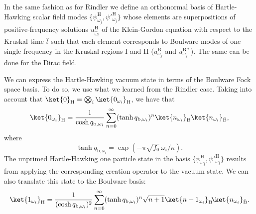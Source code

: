 In the same fashion as for Rindler we define an orthonormal basis 
of Hartle-Hawking scalar field modes $\{\psi^\text{H}_{\omega_j},\psi'^{\text{H}}_{\omega_j}\}$ whose elements are superpositions of  positive-frequency solutions
$u_{\hat\omega_i}^\text{H}$ of the Klein-Gordon equation with
respect to the Kruskal time $\hat t$
 such that each element  corresponds to Boulware modes of one single frequency in the Kruskal regions I and II
($u^\text{B}_{\omega_j}$ and $u^{\bar{\text{B}}*}_{\omega_j}$). The same can be
done for the Dirac field.

We can express the Hartle-Hawking vacuum state in terms of the
Boulware Fock space basis.  To do so, we use what we learned from the
Rindler case. Taking into account that $\ket{0}_\text{H}=\bigotimes_{
i}\ket{0_{\omega_i}}_\text{H}$, we have that
\begin{equation}\label{scavacinf}
\ket{0_{\omega_i}}_\text{H}=\frac{1}{\cosh q_{\text{b},\omega_i}}
\sum_{n=0}^\infty (\tanh q_{\text{b},\omega_i})^n  \ket{n_{\omega_i}}_\text{B}
\ket{n_{\omega_i}}_{{\bar{\text{B}}}},
\end{equation}
where
\begin{equation}\label{defr3}
\tanh q_{\text{b},\omega_i}=\exp\left({-\pi \sqrt{f_0}\,\omega_i/{\kappa}}\right)
.
\end{equation}
The unprimed Hartle-Hawking one particle state in the basis $\{\psi^\text{H}_{\omega_j},\psi'^{\text{H}}_{\omega_j}\}$ results
from applying the corresponding creation operator to the vacuum state.
We can also translate this state to the Boulware basis:
  \begin{equation}\label{unoinf}
\ket{1_{\omega_i}}_\text{H} = \frac{1}{(\cosh q_{\text{b},\omega_i})^2}\sum_{n=0}^{\infty} (\tanh  q_{\text{b},\omega_i})^n\sqrt{n+1}
\ket{n+1_{\omega_i}}_\text{B}\!\ket{n_{ \omega_i}}_{{\bar{\text{B}}}}.
\end{equation} 


